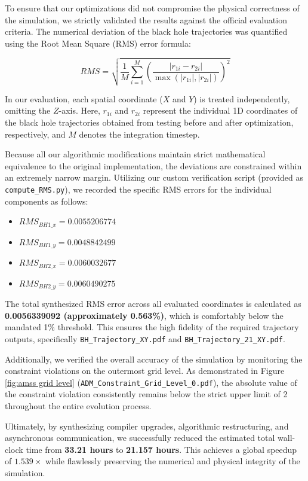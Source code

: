 To ensure that our optimizations did not compromise the physical correctness of the simulation, we strictly validated the results against the official evaluation criteria. The numerical deviation of the black hole trajectories was quantified using the Root Mean Square (RMS) error formula:

\begin{equation}
RMS = \sqrt{\frac{1}{M} \sum_{i=1}^{M} \left( \frac{|r_{1i} - r_{2i}|}{\max (|r_{1i}|, |r_{2i}|)} \right)^2}
\end{equation}

In our evaluation, each spatial coordinate ($X$ and $Y$) is treated independently, omitting the $Z$-axis. Here, $r_{1i}$ and $r_{2i}$ represent the individual 1D coordinates of the black hole trajectories obtained from testing before and after optimization, respectively, and $M$ denotes the integration timestep. 

Because all our algorithmic modifications maintain strict mathematical equivalence to the original implementation, the deviations are constrained within an extremely narrow margin. Utilizing our custom verification script (provided as \texttt{compute\_RMS.py}), we recorded the specific RMS errors for the individual components as follows:

\begin{itemize}
    \item $RMS_{BH1\_x} = 0.0055206774$
    \item $RMS_{BH1\_y} = 0.0048842499$
    \item $RMS_{BH2\_x} = 0.0060032677$
    \item $RMS_{BH2\_y} = 0.0060490275$
\end{itemize}

The total synthesized RMS error across all evaluated coordinates is calculated as \textbf{0.0056339092 (approximately 0.563\%)}, which is comfortably below the mandated 1\% threshold. This ensures the high fidelity of the required trajectory outputs, specifically \texttt{BH\_Trajectory\_XY.pdf} and \texttt{BH\_Trajectory\_21\_XY.pdf}.

Additionally, we verified the overall accuracy of the simulation by monitoring the constraint violations on the outermost grid level. As demonstrated in Figure \ref{fig:amss grid level} (\texttt{ADM\_Constraint\_Grid\_Level\_0.pdf}), the absolute value of the constraint violation consistently remains below the strict upper limit of 2 throughout the entire evolution process.

Ultimately, by synthesizing compiler upgrades, algorithmic restructuring, and asynchronous communication, we successfully reduced the estimated total wall-clock time from \textbf{33.21 hours} to \textbf{21.157 hours}. This achieves a global speedup of $\mathbf{1.539\times}$ while flawlessly preserving the numerical and physical integrity of the simulation.
